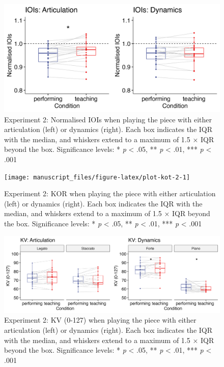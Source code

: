 \documentclass[
  english,
  man,floatsintext]{apa6}
\begin{document}
\begin{figure}
\includegraphics[width=1\linewidth]{manuscript_files/figure-latex/plot-ioi-2-1} \caption{\label{fig:ioi-2}Experiment 2: Normalised IOIs when playing the piece with either articulation (left) or dynamics (right). Each box indicates the IQR with the median, and whiskers extend to a maximum of 1.5 × IQR beyond the box. Significance levels: * \textit{p} < .05, ** \textit{p} < .01, *** \textit{p} < .001}\label{fig:plot-ioi-2}
\end{figure}

\begin{figure}
\texttt{[image: manuscript\_files/figure-latex/plot-kot-2-1]} \caption{\label{fig:kot-2}Experiment 2: KOR when playing the piece with either articulation (left) or dynamics (right). Each box indicates the IQR with the median, and whiskers extend to a maximum of 1.5 × IQR beyond the box. Significance levels: * \textit{p} < .05, ** \textit{p} < .01, *** \textit{p} < .001}\label{fig:plot-kot-2}
\end{figure}

\begin{figure}
\includegraphics[width=1\linewidth]{manuscript_files/figure-latex/plot-vel-2-1} \caption{\label{fig:vel-2}Experiment 2: KV (0-127) when playing the piece with either articulation (left) or dynamics (right). Each box indicates the IQR with the median, and whiskers extend to a maximum of 1.5 × IQR beyond the box. Significance levels: * \textit{p} < .05, ** \textit{p} < .01, *** \textit{p} < .001}\label{fig:plot-vel-2}
\end{figure}
\end{document}
